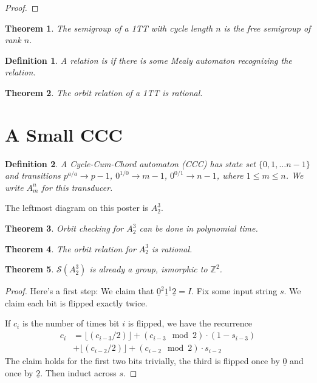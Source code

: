 \documentclass[a0,landscape, 16pt]{a0poster}
\newcommand*{\concourse}{\fontspec[]{Concourse T4}\selectfont}
\theoremstyle{pleasant}
\newtheorem{theorem}{Theorem}
\newtheorem{definition}{Definition}
\newcommand{\0}{\underline{0}}
\newcommand{\1}{\underline{1}}
\newcommand{\2}{\underline{2}}
\newcommand{\Z}{\mathbb{Z}}
\renewcommand{\S}{\mathcal{S}}
\begin{document}
\begin{multicols}{3}
\begin{proof}
\end{proof}

\begin{theorem}
The semigroup of a 1TT with cycle length $n$ is the free semigroup of rank $n$.
\end{theorem}

\begin{definition}
A relation is {\normalfont\concourse{rational}} if there is some Mealy automaton recognizing the relation.
\end{definition}

\begin{theorem}
The orbit relation of a 1TT is rational.
\end{theorem}

\section*{A Small CCC}
\begin{definition}
A Cycle-Cum-Chord automaton (CCC) has state set $\{0, 1, \ldots n-1\}$ and transitions $p ^{a/a}\rightarrow p - 1$, $0 ^{1/0}\rightarrow m - 1$, $0 ^{0/1}\rightarrow n - 1$, where $1 \leq m \leq n$. We write $A^n_m$ for this transducer.
\end{definition}

The leftmost diagram on this poster is $A^3_2$.

\begin{theorem}
Orbit checking for $A^3_2$ can be done in polynomial time.
\end{theorem}

\begin{theorem}
The orbit relation for $A^3_2$ is rational.
\end{theorem}

\begin{theorem}
$\S(A^3_2)$ is already a group, ismorphic to $\Z^2$.
\end{theorem}
\begin{proof}
Here's a first step:
We claim that
$\0^2\1^1\2 = I$. Fix some input string $s$. We claim each bit is flipped exactly twice.

If $c_i$ is the number of times bit $i$ is flipped, we have the recurrence
\begin{align*}
c_i &= \lfloor (c_{i-3} / 2) \rfloor + (c_{i-3} \mod{2}) \cdot (1 - s_{i-3})\\
    &+\lfloor (c_{i-2} / 2) \rfloor + (c_{i-2} \mod{2}) \cdot s_{i-2}
\end{align*}
The claim holds for the first two bits trivially, the third is flipped once by $\0$ and once by $\2$. Then induct across $s$.


\end{proof}
\end{multicols}
\end{document}

